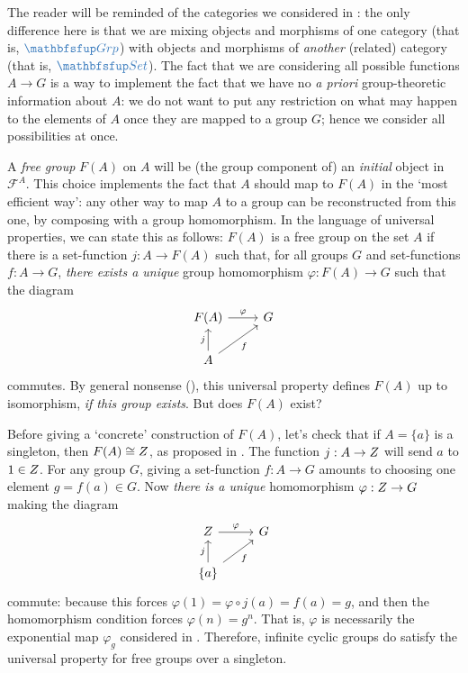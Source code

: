 The reader will be reminded of the categories we considered in
: the only difference here is that
we are mixing objects and morphisms of one category (that is,
$\categ{Grp}$) with objects and morphisms of \emph{another} (related)
category (that is, $\categ{Set}$).  The fact that we are considering
all possible functions $A \to G$ is a way to implement the fact that
we have no \emph{a priori} group-theoretic information about $A$: we
do not want to put any restriction on what may happen to the elements
of $A$ once they are mapped to a group $G$; hence we consider all
possibilities at once.

A \emph{free group} $F(A)$ on $A$ will be (the group component of) an
\emph{initial} object in $\mathscr{F}^A$. This choice implements the
fact that $A$ should map to $F(A)$ in the `most efficient way': any
other way to map $A$ to a group can be reconstructed from this one, by
composing with a group homomorphism. In the language of universal
properties, we can state this as follows: $F(A)$ is a free group on
the set $A$ if there is a set-function $j : A \to F(A)$ such that, for
all groups $G$ and set-functions $f : A \to G$, \emph{there exists a
  unique} group homomorphism $\varphi : F(A) \to G$ such that the
diagram
\[
  \begin{tikzcd}
    F(A) \arrow[r, "\varphi"] & G \\
    A \arrow[u, "j"] \arrow[ur, "f"'] &
  \end{tikzcd}
\]
commutes. By general nonsense
(), this universal property
defines $F(A)$ up to isomorphism, \emph{if this group exists}. But
does $F(A)$ exist?

Before giving a `concrete' construction of $F(A)$, let's check that if
$A = \{a\}$ is a singleton, then $F(A) \cong Z$, as proposed in
. The function $j : A \to Z$ will
send $a$ to $1 \in Z$. For any group $G$, giving a set-function
$f : A \to G$ amounts to choosing one element $g = f(a) \in G$. Now
\emph{there is a unique} homomorphism $\varphi : Z \to G$ making the
diagram
\[
  \begin{tikzcd}
    \Z \arrow[r, "\varphi"] & G \\
    \{a\} \arrow[u, "j"] \arrow[ur, "f"'] &
  \end{tikzcd}
\]
commute: because this forces
$\varphi(1) = \varphi \circ j(a) = f(a) = g$, and then the
homomorphism condition forces $\varphi(n) = g^n$. That is, $\varphi$
is necessarily the exponential map $\varphi_g$ considered in
. Therefore, infinite cyclic groups do
satisfy the universal property for free groups over a singleton.

